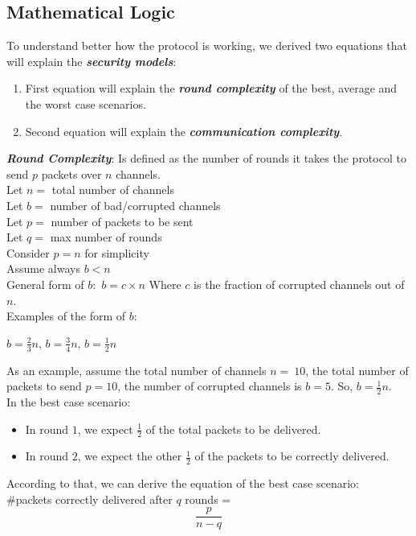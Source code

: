 \documentclass[main.tex]{subfiles}
\begin{document}
\normalsize
\begin{center}\section{Mathematical Logic}\end{center}
To understand better how the protocol is working, we derived two equations that will explain the \textbf{\textit{security models}}:
\begin{enumerate}
\item First equation will explain the \textbf{\textit{round complexity}} of the best, average and the worst case scenarios.
\item Second equation will explain the \textbf{\textit{communication complexity}}.
\end{enumerate}
\textbf{\textit{Round Complexity}}: Is defined as the number of rounds it takes the protocol to send $p$ packets over $n$ channels.
\\
Let $n = $ total number of channels\\
Let $b = $ number of bad/corrupted channels\\
Let $p = $ number of packets to be sent\\
Let $q = $ max number of rounds\\
Consider $p = n$ for simplicity\\
Assume always $b < n$\\
General form of $b:$ 
$b= c \times n$ Where $c$ is the fraction of corrupted channels out of $n$.\\

Examples of the form of $b$: \begin{center}$b = \displaystyle \frac{2}{3}n$, \tab$b = \displaystyle \frac{3}{4}n$, \tab$b = \displaystyle \frac{1}{2}n$\end{center}

As an example, assume the total number of channels $n=~10$, the total number of packets to send $p = 10$, the number of corrupted channels is $b=5$. So, $b = \frac{1}{2}n$. \\

In the best case scenario:
\begin{itemize}
\item In round $1$, we expect $\frac{1}{2}$ of the total packets to be delivered.
\item In round $2$, we expect the other $\frac{1}{2}$ of the packets to be correctly delivered.
\end{itemize}
According to that, we can derive the equation of the best case scenario:\\
\#packets correctly delivered after $q$ rounds =\begin{equation} \frac{p}{n-q}\end{equation}
\end{document}
